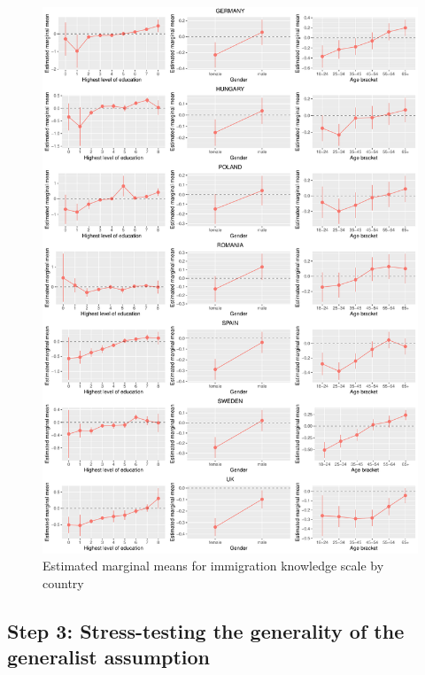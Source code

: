 \documentclass[12pt,halfline,a4paper,]{ouparticle}
\begin{document}
\begin{figure}[!h]
\includegraphics[width=1\linewidth]{Revisiting-the-Measurement-and-Dimensionality-of-Political-Knowledge--Evidence-from-Seven-European-Countries_files/figure-latex/emmeans_plots3b-1} \caption{Estimated marginal means for immigration knowledge scale by country}\label{fig:emmeans_plots3b}
\end{figure}

\hypertarget{step-3-stress-testing-the-generality-of-the-generalist-assumption}{%
\subsection{Step 3: Stress-testing the generality of the generalist
assumption}\label{step-3-stress-testing-the-generality-of-the-generalist-assumption}}
\end{document}
